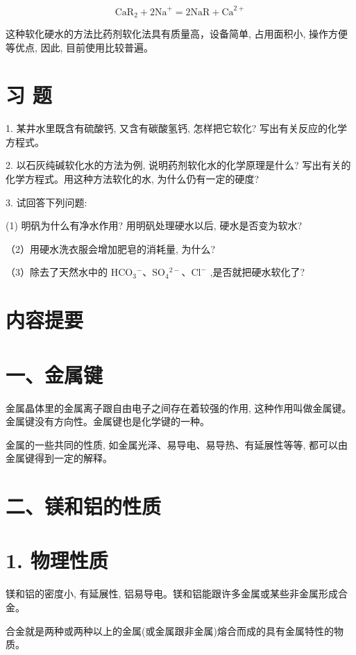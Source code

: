 \documentclass[10pt]{article}
\begin{document}
\[
{\mathrm{{CaR}}}_{2} + 2{\mathrm{{Na}}}^{ + } = 2\mathrm{{NaR}} + {\mathrm{{Ca}}}^{2 + }
\]

这种软化硬水的方法比药剂软化法具有质量高，设备简单, 占用面积小, 操作方便等优点, 因此, 目前使用比较普遍。

\section*{习 题}

1. 某井水里既含有硫酸钙, 又含有碳酸氢钙, 怎样把它软化? 写出有关反应的化学方程式。

2. 以石灰纯碱软化水的方法为例, 说明药剂软化水的化学原理是什么? 写出有关的化学方程式。用这种方法软化的水, 为什么仍有一定的硬度?

3. 试回答下列问题:

(1) 明矾为什么有净水作用? 用明矾处理硬水以后, 硬水是否变为软水?

（2）用硬水洗衣服会增加肥皂的消耗量, 为什么?

（3）除去了天然水中的 \({\mathrm{{HCO}}}_{3}{}^{ - }\text{、}{\mathrm{{SO}}}_{4}{}^{2 - }\text{、}{\mathrm{{Cl}}}^{ - }\) ,是否就把硬水软化了?

\section*{内容提要}

\section*{一、金属键}

金属晶体里的金属离子跟自由电子之间存在着较强的作用, 这种作用叫做金属键。金属键没有方向性。金属键也是化学键的一种。

金属的一些共同的性质, 如金属光泽、易导电、易导热、有延展性等等, 都可以由金属键得到一定的解释。

\section*{二、镁和铝的性质}

\section*{1. 物理性质}

镁和铝的密度小, 有延展性, 铝易导电。镁和铝能跟许多金属或某些非金属形成合金。

合金就是两种或两种以上的金属(或金属跟非金属)熔合而成的具有金属特性的物质。
\end{document}
